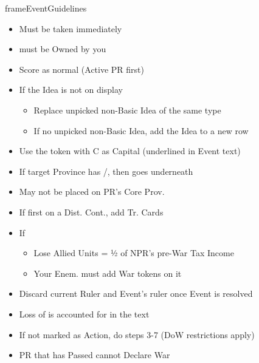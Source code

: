 \documentclass[10pt]{article}
\newlength{\fhEventGuidelines} \setlength\fhEventGuidelines{35.5\baselineskip}
\begin{document}
\begin{dynamiccontents*}{frameEventGuidelines}
\begin{eubox}{\fhEventGuidelines}
\begin{multicols*}{2}
		\begin{itemize}
			\item Must be taken immediately
		\end{itemize}
		\begin{itemize}
			\item \town must be Owned by you
		\end{itemize}	
		\begin{itemize}
			\item Score \prestige as normal (Active PR first)
			\item If the Idea is not on display
			\begin{itemize}
				\item Replace unpicked non-Basic Idea of the same type
				\item If no unpicked non-Basic Idea, add the Idea to a new row
			\end{itemize}
		\end{itemize}
		\begin{itemize}
			\item Use the token with C as Capital (underlined in Event text)
			\item If target Province has \town/\vassal, then \dnpr goes underneath
			\item May not be placed on PR's Core Prov.
			\item If first \dnpr on a Dist. Cont., add Tr. Cards
		\end{itemize}
		\begin{itemize}
			\item If \activeally
			\begin{itemize}
				\item Lose Allied Units = ½ of NPR's pre-War Tax Income
				\item Your Enem. must add War tokens on it
			\end{itemize}
		\end{itemize}
		\begin{itemize}
			\item Discard current Ruler and Event's ruler once Event is resolved
		\end{itemize}
		\begin{itemize}
			\item Loss of \authority is accounted for in the text
		\end{itemize}
		\begin{itemize}
			\item If not marked as  Action, do steps 3-7 (DoW restrictions apply)
			\item PR that has Passed cannot Declare War
		\end{itemize}
	\end{multicols*}
\end{eubox}\end{dynamiccontents*}
\end{document}
